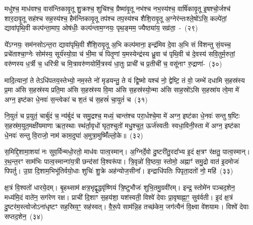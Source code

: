 {\anuvakamend[{फल्गु॑नी॒ नक्ष॑त्रं॒ वस॑व॒स्त्रय॑स्त्रिꣳशच्च}]}%

मधु॑श्च॒ माध॑वश्च॒ वास॑न्तिकावृ॒तू शु॒क्रश्च॒ शुचि॑श्च॒ ग्रैष्मा॑वृ॒तू नभ॑श्च नभ॒स्य॑श्च॒ वार्\mbox{}षि॑कावृ॒तू इ॒षश्चो॒र्जश्च॑ शार॒दावृ॒तू सह॑श्च सह॒स्य॑श्च॒ हैम॑न्तिकावृ॒तू तप॑श्च तप॒स्य॑श्च शैशि॒रावृ॒तू अ॒ग्नेर॑न्तःश्ले॒षो॑\-ऽसि॒ कल्पे॑तां॒ द्यावा॑\-पृथि॒वी कल्प॑न्ता॒माप॒ ओष॑धीः॒ कल्प॑न्ताम॒ग्नयः॒ पृथ॒ङ्मम॒ ज्यैष्ठ्या॑य॒ सव्र॑ता॒~-~(२९)\ip

ये᳚\-ऽग्नयः॒ सम॑नसो\-ऽन्त॒रा द्यावा॑\-पृथि॒वी शै॑शि॒रावृ॒तू अ॒भि कल्प॑माना॒ इन्द्र॑मिव दे॒वा अ॒भि सं वि॑शन्तु सं॒यच्च॒ प्रचे॑ताश्चा॒ग्नेः सोम॑स्य॒ सूर्य॑स्यो॒ग्रा च॑ भी॒मा च॑ पितृ॒णां य॒मस्येन्द्र॑स्य ध्रु॒वा च॑ पृथि॒वी च॑ दे॒वस्य॑ सवि॒तुर्म॒रुतां॒ वरु॑णस्य ध॒र्त्री च॒ धरि॑त्री च मि॒त्रावरु॑णयोर्मि॒त्रस्य॑ धा॒तुः प्राची॑ च प्र॒तीची॑ च॒ वसू॑नाꣳ रु॒द्राणा॑-~(३०)\ip

मादि॒त्यानां॒ ते ते\-ऽधि॑पतय॒स्तेभ्यो॒ नम॒स्ते नो॑ मृडयन्तु॒ ते यं द्वि॒ष्मो यश्च॑ नो॒ द्वेष्टि॒ तं वो॒ जम्भे॑ दधामि स॒हस्र॑स्य प्र॒मा अ॑सि स॒हस्र॑स्य प्रति॒मा अ॑सि स॒हस्र॑स्य वि॒मा अ॑सि स॒हस्र॑स्यो॒न्मा अ॑सि साह॒स्रो॑\-ऽसि स॒हस्रा॑य त्वे॒मा मे॑ अग्न॒ इष्ट॑का धे॒नवः॑ स॒न्त्वेका॑ च श॒तं च॑ स॒हस्रं॑ चा॒युतं॑ च~(३१)\ip

नि॒युतं॑ च प्र॒युतं॒ चार्बु॑दं च॒ न्य॑र्बुदं च समु॒द्रश्च॒ मध्यं॒ चान्त॑श्च परा॒र्धश्चे॒मा मे॑ अग्न॒ इष्ट॑का धे॒नवः॑ सन्तु ष॒ष्टिः स॒हस्र॑म॒युत॒मक्षी॑यमाणा ऋत॒स्थाः स्थ॑र्ता॒वृधो॑ घृत॒श्चुतो॑ मधु॒श्चुत॒ ऊर्ज॑स्वतीः स्वधा॒विनी॒स्ता मे॑ अग्न॒ इष्ट॑का धे॒नवः॑ सन्तु वि॒राजो॒ नाम॑ काम॒दुघा॑ अ॒मुत्रा॒मुष्मिँ॑ल्लो॒के॥~(३२)\ip

{\anuvakamend[{सव्र॑ता रु॒द्राणा॑म॒युतं॑ च॒ पञ्च॑चत्वारिꣳशच्च}]}%

स॒मिद्दि॒शामा॒शया॑ नः सुव॒र्विन्मधो॒रतो॒ माध॑वः पात्व॒स्मान्। अ॒ग्निर्दे॒वो दु॒ष्टरी॑तु॒रदा᳚भ्य इ॒दं क्ष॒त्रꣳ र॑क्षतु॒ पात्व॒स्मान्। र॒थ॒न्त॒रꣳ साम॑भिः पात्व॒स्मान्गा॑य॒त्री छन्द॑सां वि॒श्वरू॑पा। त्रि॒वृन्नो॑ वि॒ष्ठया॒ स्तोमो॒ अह्नाꣳ॑ समु॒द्रो वात॑ इ॒दमोजः॑ पिपर्तु। उ॒ग्रा दि॒शाम॒भिभू॑तिर्वयो॒धाः शुचिः॑ शु॒क्रे अह॑न्योज॒सीना᳚। इन्द्राधि॑\-पतिः पिपृता॒दतो॑ नो॒ महि॑~(३३)\ip

क्ष॒त्रं वि॒श्वतो॑ धारये॒दम्। बृ॒हथ्साम॑ क्षत्र॒भृद्वृ॒द्धवृ॑ष्णियं त्रि॒ष्टुभौजः॑ शुभि॒तमु॒ग्रवी॑रम्। इन्द्र॒ स्तोमे॑न पञ्चद॒शेन॒ मध्य॑मि॒दं वाते॑न॒ सग॑रेण रक्ष। प्राची॑ दि॒शाꣳ स॒हय॑शा॒ यश॑स्वती॒ विश्वे॑ देवाः प्रा॒वृषाह्ना॒ꣳ॒ सुव॑र्वती। इ॒दं क्ष॒त्रं दु॒ष्टर॑म॒स्त्वोजो\-ऽना॑धृष्टꣳ सह॒स्रिय॒ꣳ॒ सह॑स्वत्। वै॒रू॒पे साम॑न्नि॒ह तच्छ॑केम॒ जग॑त्यैनं वि॒क्ष्वा वे॑शयामः। विश्वे॑ देवाः सप्तद॒शेन॒~(३४)\ip

